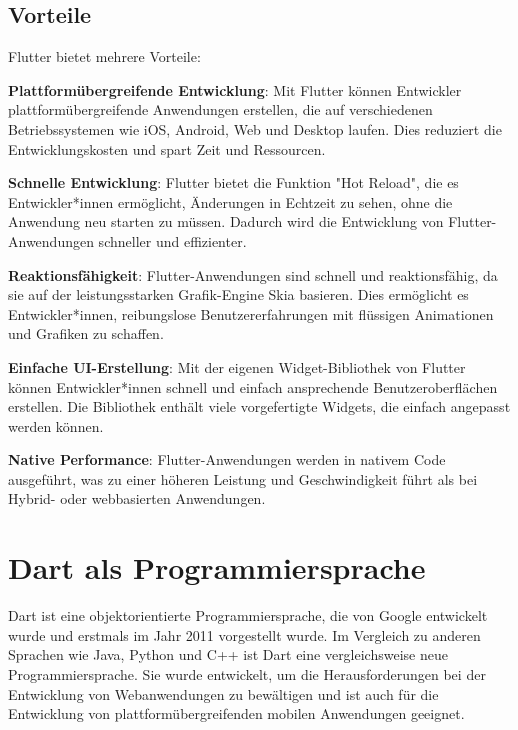 \subsection{Vorteile}
Flutter bietet mehrere Vorteile:

\begin{compactitem}
    \item \textbf{Plattformübergreifende Entwicklung}: Mit Flutter können Entwickler plattformübergreifende Anwendungen erstellen, die auf verschiedenen Betriebssystemen wie iOS, 
    Android, Web und Desktop laufen. Dies reduziert die Entwicklungskosten und spart Zeit und Ressourcen.
    \item \textbf{Schnelle Entwicklung}: Flutter bietet die Funktion "Hot Reload", die es Entwickler*innen ermöglicht, Änderungen in Echtzeit zu sehen, 
    ohne die Anwendung neu starten zu müssen. Dadurch wird die Entwicklung von Flutter-Anwendungen schneller und effizienter.
    \item \textbf{Reaktionsfähigkeit}: Flutter-Anwendungen sind schnell und reaktionsfähig, da sie auf der leistungsstarken Grafik-Engine Skia basieren. 
    Dies ermöglicht es Entwickler*innen, reibungslose Benutzererfahrungen mit flüssigen Animationen und Grafiken zu schaffen.
    \item \textbf{Einfache UI-Erstellung}: Mit der eigenen Widget-Bibliothek von Flutter können Entwickler*innen schnell und einfach ansprechende Benutzeroberflächen erstellen. 
    Die Bibliothek enthält viele vorgefertigte Widgets, die einfach angepasst werden können.
    \item \textbf{Native Performance}: Flutter-Anwendungen werden in nativem Code ausgeführt, was zu einer höheren Leistung und Geschwindigkeit führt als bei Hybrid- oder webbasierten Anwendungen.
\end{compactitem}

\newpage
\section{Dart als Programmiersprache}
Dart ist eine objektorientierte Programmiersprache, die von Google entwickelt wurde und erstmals im Jahr 2011 vorgestellt wurde. Im Vergleich zu anderen Sprachen wie Java, Python und C++ ist Dart eine vergleichsweise neue Programmiersprache. Sie wurde entwickelt, um die Herausforderungen bei der Entwicklung von Webanwendungen zu bewältigen und ist auch für die Entwicklung von plattformübergreifenden mobilen Anwendungen geeignet.

